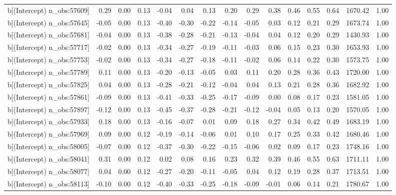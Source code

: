 \begin{table}[ht]
\begin{tabular}{rrrrrrrrrrrrrrr}
  b[(Intercept) n\_obs:57609] & 0.29 & 0.00 & 0.13 & -0.04 & 0.04 & 0.13 & 0.20 & 0.29 & 0.38 & 0.46 & 0.55 & 0.64 & 1670.42 & 1.00 \\ 
  b[(Intercept) n\_obs:57645] & -0.05 & 0.00 & 0.13 & -0.40 & -0.30 & -0.22 & -0.14 & -0.05 & 0.03 & 0.12 & 0.21 & 0.29 & 1673.74 & 1.00 \\ 
  b[(Intercept) n\_obs:57681] & -0.04 & 0.00 & 0.13 & -0.38 & -0.28 & -0.21 & -0.13 & -0.04 & 0.04 & 0.12 & 0.20 & 0.29 & 1430.93 & 1.00 \\ 
  b[(Intercept) n\_obs:57717] & -0.02 & 0.00 & 0.13 & -0.34 & -0.27 & -0.19 & -0.11 & -0.03 & 0.06 & 0.15 & 0.23 & 0.30 & 1653.93 & 1.00 \\ 
  b[(Intercept) n\_obs:57753] & -0.02 & 0.00 & 0.13 & -0.34 & -0.27 & -0.18 & -0.11 & -0.02 & 0.06 & 0.14 & 0.22 & 0.30 & 1573.75 & 1.00 \\ 
  b[(Intercept) n\_obs:57789] & 0.11 & 0.00 & 0.13 & -0.20 & -0.13 & -0.05 & 0.03 & 0.11 & 0.20 & 0.28 & 0.36 & 0.43 & 1720.00 & 1.00 \\ 
  b[(Intercept) n\_obs:57825] & 0.04 & 0.00 & 0.13 & -0.28 & -0.21 & -0.12 & -0.04 & 0.04 & 0.13 & 0.21 & 0.28 & 0.36 & 1682.92 & 1.00 \\ 
  b[(Intercept) n\_obs:57861] & -0.09 & 0.00 & 0.13 & -0.41 & -0.33 & -0.25 & -0.17 & -0.09 & 0.00 & 0.08 & 0.17 & 0.23 & 1581.05 & 1.00 \\ 
  b[(Intercept) n\_obs:57897] & -0.12 & 0.00 & 0.13 & -0.45 & -0.37 & -0.28 & -0.21 & -0.12 & -0.04 & 0.05 & 0.13 & 0.20 & 1570.05 & 1.00 \\ 
  b[(Intercept) n\_obs:57933] & 0.18 & 0.00 & 0.13 & -0.16 & -0.07 & 0.01 & 0.09 & 0.18 & 0.27 & 0.34 & 0.42 & 0.49 & 1683.19 & 1.00 \\ 
  b[(Intercept) n\_obs:57969] & 0.09 & 0.00 & 0.12 & -0.19 & -0.14 & -0.06 & 0.01 & 0.10 & 0.17 & 0.25 & 0.33 & 0.42 & 1680.46 & 1.00 \\ 
  b[(Intercept) n\_obs:58005] & -0.07 & 0.00 & 0.12 & -0.37 & -0.30 & -0.22 & -0.15 & -0.06 & 0.02 & 0.09 & 0.17 & 0.23 & 1748.16 & 1.00 \\ 
  b[(Intercept) n\_obs:58041] & 0.31 & 0.00 & 0.12 & 0.02 & 0.08 & 0.16 & 0.23 & 0.32 & 0.39 & 0.46 & 0.55 & 0.63 & 1711.11 & 1.00 \\ 
  b[(Intercept) n\_obs:58077] & 0.04 & 0.00 & 0.12 & -0.27 & -0.20 & -0.11 & -0.05 & 0.04 & 0.12 & 0.19 & 0.28 & 0.37 & 1713.51 & 1.00 \\ 
  b[(Intercept) n\_obs:58113] & -0.10 & 0.00 & 0.12 & -0.40 & -0.33 & -0.25 & -0.18 & -0.09 & -0.01 & 0.06 & 0.14 & 0.21 & 1780.67 & 1.00 \\ 

\end{tabular}
\end{table}
